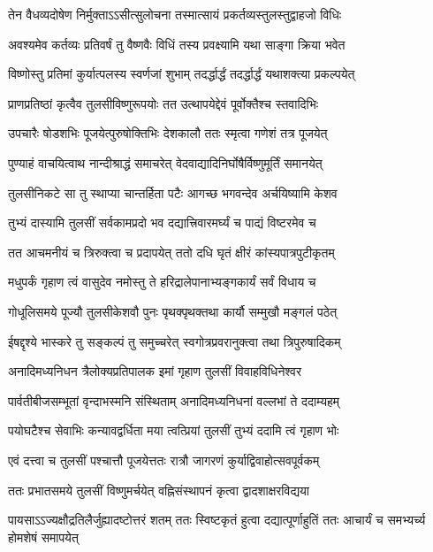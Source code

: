 \twolineshloka
{तेन वैधव्यदोषेण निर्मुक्ताऽऽसीत्सुलोचना}
{तस्मात्सायं प्रकर्तव्यस्तुलस्तुद्वाहजो विधिः} %

\twolineshloka
{अवश्यमेव कर्तव्यः प्रतिवर्षं तु वैष्णवैः}
{विधिं तस्य प्रवक्ष्यामि यथा साङ्गा क्रिया भवेत} %

\twolineshloka
{विष्णोस्तु प्रतिमां कुर्यात्पलस्य स्वर्णजां शुभाम्}
{तदर्द्धार्द्धं तदर्द्धार्द्धं यथाशक्त्या प्रकल्पयेत्} %

\twolineshloka
{प्राणप्रतिष्ठां कृत्वैव तुलसीविष्णुरूपयोः}
{तत उत्थापयेद्देवं पूर्वोक्तैश्च स्तवादिभिः} %

\twolineshloka
{उपचारैः षोडशभिः पूजयेत्पुरुषोक्तिभिः}
{देशकालौ ततः स्मृत्वा गणेशं तत्र पूजयेत्} %

\twolineshloka
{पुण्याहं वाचयित्वाथ नान्दीश्राद्धं समाचरेत्}
{वेदवाद्यादिनिर्घोषैर्विष्णुमूर्तिं समानयेत्} %

\twolineshloka
{तुलसीनिकटे सा तु स्थाप्या चान्तर्हिता पटैः}
{आगच्छ भगवन्देव अर्चयिष्यामि केशव} %

\twolineshloka
{तुभ्यं दास्यामि तुलसीं सर्वकामप्रदो भव}
{दद्यात्त्रिवारमर्घ्यं च पाद्यं विष्टरमेव च} %

\twolineshloka
{तत आचमनीयं च त्रिरुक्त्वा च प्रदापयेत्}
{ततो दधि घृतं क्षीरं कांस्यपात्रपुटीकृतम्} %

\twolineshloka
{मधुपर्कं गृहाण त्वं वासुदेव नमोस्तु ते}
{हरिद्रालेपानाभ्यङ्गकार्यं सर्वं विधाय च} %

\twolineshloka
{गोधूलिसमये पूज्यौ तुलसीकेशवौ पुनः}
{पृथक्पृथक्तथा कार्यौ सम्मुखौ मङ्गलं पठेत्} %

\twolineshloka
{ईषद्दृश्ये भास्करे तु सङ्कल्पं तु समुच्चरेत्}
{स्वगोत्रप्रवरानुक्त्वा तथा त्रिपुरुषादिकम्} %

\twolineshloka
{अनादिमध्यनिधन त्रैलोक्यप्रतिपालक}
{इमां गृहाण तुलसीं विवाहविधिनेश्वर} %

\twolineshloka
{पार्वतीबीजसम्भूतां वृन्दाभस्मनि संस्थिताम्}
{अनादिमध्यनिधनां वल्लभां ते ददाम्यहम्} %

\twolineshloka
{पयोघटैश्च सेवाभिः कन्यावद्वर्धिता मया}
{त्वत्प्रियां तुलसीं तुभ्यं ददामि त्वं गृहाण भोः} %

\twolineshloka
{एवं दत्त्वा च तुलसीं पश्चात्तौ पूजयेत्ततः}
{रात्रौ जागरणं कुर्याद्विवाहोत्सवपूर्वकम्} %

\twolineshloka
{ततः प्रभातसमये तुलसीं विष्णुमर्चयेत्}
{वह्निसंस्थापनं कृत्वा द्वादशाक्षरविद्यया} %

\threelineshloka
{पायसाऽऽज्यक्षौद्रतिलैर्जुह्यादष्टोत्तरं शतम्}
{ततः स्विष्टकृतं हुत्वा दद्यात्पूर्णाहुतिं ततः}
{आचार्यं च समभ्यर्च्य होमशेषं समापयेत्} %

